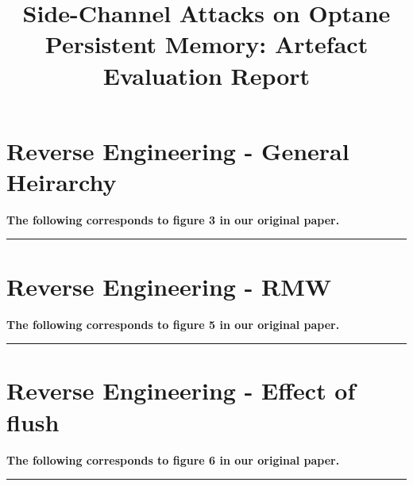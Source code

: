 \documentclass[letterpaper,twocolumn,10pt]{article}
\begin{document}
\title{Side-Channel Attacks on Optane Persistent Memory: Artefact Evaluation Report}

\maketitle

\newcommand{\corresponds}[1]{\textbf{The following corresponds to #1  in our original paper.}}

\begin{minipage}{\linewidth}
\section*{Reverse Engineering - General Heirarchy}
\corresponds{figure 3}
\begin{figure}[H]
\centering
{}
\label{fig:general_hierarchy}
\end{figure}
\hrule
\end{minipage}

\begin{minipage}{\linewidth}
\section*{Reverse Engineering - RMW }
\corresponds{figure 5}
\begin{figure}[H]
\centering
\begin{subfigure}[b]{0.49\hsize}

\end{subfigure}
\begin{subfigure}[b]{0.49\hsize}

\end{subfigure}
\label{fig:rmw_reverse}
\end{figure}
\hrule
\end{minipage}

\begin{minipage}{\linewidth}
\section*{Reverse Engineering - Effect of flush }
\corresponds{figure 6}
\begin{figure}[H]
\centering

\end{figure}
\hrule
\end{minipage}
\end{document}

